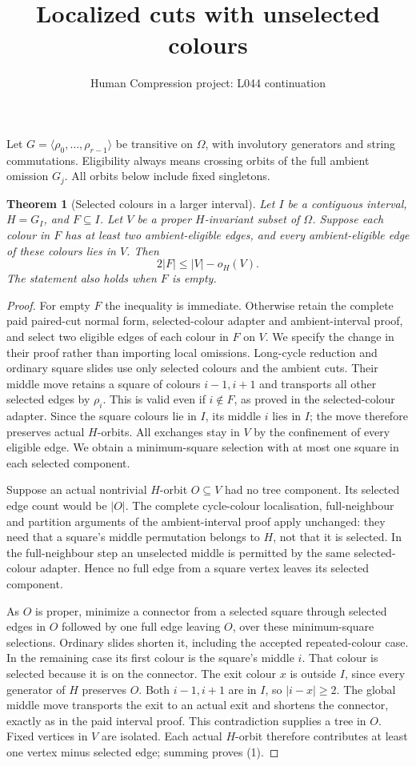 \documentclass[11pt,a4paper]{article}
\title{Localized cuts with unselected colours}
\author{Human Compression project: L044 continuation}
\date{}
\newtheorem{theorem}{Theorem}
\newcommand{\gen}[1]{\langle#1\rangle}
\begin{document}
\maketitle
Let $G=\gen{\rho_0,\ldots,\rho_{r-1}}$ be transitive on $\Omega$,
with involutory generators and string commutations. Eligibility always
means crossing orbits of the full ambient omission $G_j$.
All orbits below include fixed singletons.

\begin{theorem}[Selected colours in a larger interval]\label{larger}
Let $I$ be a contiguous interval, $H=G_I$, and $F\subseteq I$.
Let $V$ be a proper $H$-invariant subset of $\Omega$.
Suppose each colour in $F$ has at least two ambient-eligible edges,
and every ambient-eligible edge of these colours lies in $V$.
Then
\[
                         2|F|\le |V|-o_H(V).             \tag{1}
\]
The statement also holds when $F$ is empty.
\end{theorem}
\begin{proof}
For empty $F$ the inequality is immediate. Otherwise retain the complete
paid paired-cut normal form, selected-colour adapter and ambient-interval
proof, and select two eligible edges of each colour in $F$ on $V$.
We specify the change in their proof rather than importing local
omissions. Long-cycle reduction and ordinary square slides use only
selected colours and the ambient cuts. Their middle move retains a
square of colours $i-1,i+1$ and transports all other selected edges by
$\rho_i$. This is valid even if $i\notin F$, as proved in the
selected-colour adapter. Since the square colours lie in $I$, its
middle $i$ lies in $I$; the move therefore preserves actual $H$-orbits.
All exchanges stay in $V$ by the confinement of every eligible edge.
We obtain a minimum-square selection with at most one square in each
selected component.

Suppose an actual nontrivial $H$-orbit $O\subseteq V$ had no tree
component. Its selected edge count would be $|O|$. The complete
cycle-colour localisation, full-neighbour and partition arguments of
the ambient-interval proof apply unchanged: they need that a square's
middle permutation belongs to $H$, not that it is selected. In the
full-neighbour step an unselected middle is permitted by the same
selected-colour adapter. Hence no full edge from a square vertex leaves
its selected component.

As $O$ is proper, minimize a connector from a selected square through
selected edges in $O$ followed by one full edge leaving $O$, over these
minimum-square selections. Ordinary slides shorten it, including the
accepted repeated-colour case. In the remaining case its first colour
is the square's middle $i$. That colour is selected because it is on
the connector. The exit colour $x$ is outside $I$, since every generator
of $H$ preserves $O$. Both $i-1,i+1$ are in $I$, so $|i-x|\ge2$.
The global middle move transports the exit to an actual exit and
shortens the connector, exactly as in the paid interval proof.
This contradiction supplies a tree in $O$. Fixed vertices in $V$ are
isolated. Each actual $H$-orbit therefore contributes at least one
vertex minus selected edge; summing proves (1).
\end{proof}
\end{document}
